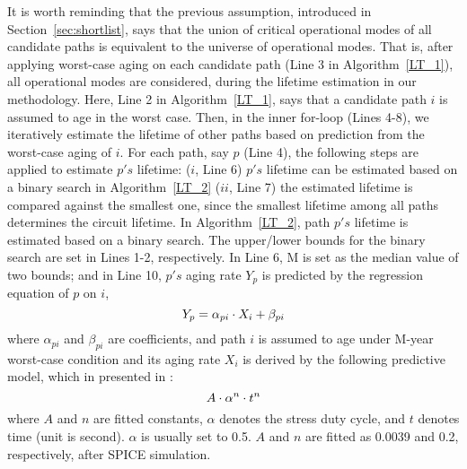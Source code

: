 It is worth reminding that the previous assumption, introduced in Section~\ref{sec:shortlist}, says that the union of critical operational modes of all candidate paths is equivalent to the universe of operational modes. That is, after applying worst-case aging on each candidate path (Line 3 in Algorithm~\ref{LT_1}), all operational modes are considered, during the lifetime estimation in our methodology. Here, Line 2 in Algorithm~\ref{LT_1}, says that a candidate path $i$ is assumed to age in the worst case. Then, in the inner for-loop (Lines 4-8), we iteratively estimate the lifetime of other paths based on prediction from the worst-case aging of $i$. For each path, say $p$ (Line 4), the following steps are applied to estimate $p's$ lifetime: ($i$, Line 6) $p's$ lifetime can be estimated based on a binary search in Algorithm~\ref{LT_2} ($ii$, Line 7) the estimated lifetime is compared against the smallest one, since the smallest lifetime among all paths determines the circuit lifetime.
In Algorithm~\ref{LT_2}, path $p's$ lifetime is estimated based on a binary search. The upper/lower bounds for the binary search are set in Lines 1-2, respectively. In Line 6, M is set as the median value of two bounds; and in Line 10, $p's$ aging rate $Y_{p}$ is predicted by the regression equation of $p$ on $i$, 
\begin{equation*}
	\fontsize{8}{9.6} \selectfont
	Y_{p} = \alpha_{pi} \cdot X_{i} + \beta_{pi}
\end{equation*}
where $ \alpha_{pi}$ and $\beta_{pi}$ are coefficients, and path $i$ is assumed to age under M-year worst-case condition and its aging rate $X_{i}$ is derived by the following predictive model, which in presented in \cite{wang2007efficient}:
\begin{equation}
	\fontsize{8}{9.6} \selectfont
	A \cdot \alpha^n \cdot t^n 
	\label{eq:worst}
\end{equation}
where $A$ and $n$ are fitted constants, $\alpha$ denotes the stress duty cycle, and $t$ denotes time (unit is second). $\alpha$ is usually set to 0.5. $A$ and $n$ are fitted as 0.0039 and 0.2, respectively, after SPICE simulation.


